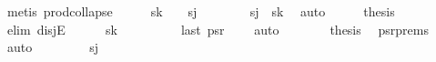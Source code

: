\begin{isabellebody}
\ {\isacharparenleft}{\kern0pt}metis\ prod{\isachardot}{\kern0pt}collapse{\isacharparenright}{\kern0pt}{\isacharplus}{\kern0pt}\isanewline
\ \ \isamarkupfalse%
\ \isamarkupfalse%
\ {\isachardoublequoteopen}s\isactrlsub k\ {\isacharequal}{\kern0pt}\ {\isacharparenleft}{\kern0pt}{}{\isacharcomma}{\kern0pt}{}{\isacharparenright}{\kern0pt}\ {\isasymor}\ s\isactrlsub j\ {\isacharequal}{\kern0pt}\ {\isacharparenleft}{\kern0pt}{}{\isacharcomma}{\kern0pt}{}{\isacharparenright}{\kern0pt}{\isachardoublequoteclose}\isanewline
\ \ \ \ \isamarkupfalse%
\ {\isacartoucheopen}s\isactrlsub j\ {\isasymnoteq}\ s\isactrlsub k{\isacartoucheclose}\ \isamarkupfalse%
\ auto\isanewline
\ \ \isamarkupfalse%
\ \isamarkupfalse%
\ {\isacharquery}{\kern0pt}thesis\isanewline
\ \ \isamarkupfalse%
\ {\isacharparenleft}{\kern0pt}elim\ disjE{\isacharparenright}{\kern0pt}\isanewline
\ \ \ \ \isamarkupfalse%
\ {\isachardoublequoteopen}s\isactrlsub k\ {\isacharequal}{\kern0pt}\ {\isacharparenleft}{\kern0pt}{}{\isacharcomma}{\kern0pt}{}{\isacharparenright}{\kern0pt}{\isachardoublequoteclose}\isanewline
\ \ \ \ \isamarkupfalse%
\ \isamarkupfalse%
\ {\isachardoublequoteopen}last\ ps\isactrlsub r\ {\isacharequal}{\kern0pt}\ {\isacharparenleft}{\kern0pt}{}{\isacharcomma}{\kern0pt}{}{\isacharparenright}{\kern0pt}{\isachardoublequoteclose}\ \isamarkupfalse%
\ auto\isanewline
\ \ \ \ \isamarkupfalse%
\ \isamarkupfalse%
\ {\isacharquery}{\kern0pt}thesis\ \isamarkupfalse%
\ ps\isactrlsub r{\isacharunderscore}{\kern0pt}prems\ \isamarkupfalse%
\ auto\isanewline
\ \ \isamarkupfalse%
\isanewline
\ \ \ \ \isamarkupfalse%
\ {\isachardoublequoteopen}s\isactrlsub j\ {\isacharequal}{\kern0pt}\ {\isacharparenleft}{\kern0pt}{}{\isacharcomma}{\kern0pt}{}{\isacharparenright}{\kern0pt}{\isachardoublequoteclose}\isanewline
\ \ \ \ \isamarkupfalse%
\ \isamarkupfalse%

\end{isabellebody}
